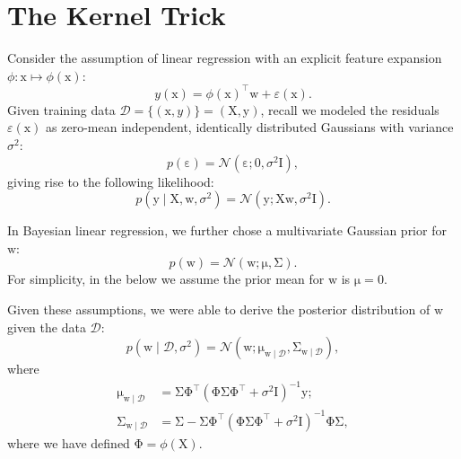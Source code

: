 \documentclass{article}
\newcommand{\given}{\mid}
\newcommand{\mc}[1]{\mathcal{#1}}
\newcommand{\data}{\mc{D}}
\newcommand{\inv}{^{-1}}
\newcommand{\trans}{^\top}
\newcommand{\mat}[1]{\bm{\mathrm{#1}}}
\renewcommand{\vec}[1]{\bm{\mathrm{#1}}}
\renewcommand{\epsilon}{\varepsilon}
\begin{document}
\section*{The Kernel Trick}

Consider the assumption of linear regression with an explicit feature
expansion $\phi\colon \vec{x} \mapsto \phi(\vec{x})$:
\begin{equation}
  \label{linear_assumption}
  y(\vec{x}) = \phi(\vec{x})\trans \vec{w} + \epsilon(\vec{x}).
\end{equation}
Given training data $\data = \bigl\{ (\vec{x}, y) \bigr\} = (\mat{X},
\vec{y})$, recall we modeled the residuals $\epsilon(\vec{x})$ as
zero-mean independent, identically distributed Gaussians with variance
$\sigma^2$:
\begin{equation*}
  p(\vec{\epsilon})
  =
  \mc{N}(\vec{\epsilon}; \vec{0}, \sigma^2 \mat{I}),
\end{equation*}
giving rise to the following likelihood:
\begin{equation*}
  p(\vec{y} \given \mat{X}, \vec{w}, \sigma^2)
  =
  \mc{N}(\vec{y}; \mat{X}\vec{w}, \sigma^2 \mat{I}).
\end{equation*}

In Bayesian linear regression, we further chose a multivariate
Gaussian prior for $\vec{w}$:
\begin{equation*}
  p(\vec{w}) = \mc{N}(\vec{w}; \vec{\mu}, \mat{\Sigma}).
\end{equation*}
For simplicity, in the below we assume the prior mean for $\vec{w}$ is
$\vec{\mu} = \vec{0}$.

Given these assumptions, we were able to derive the posterior
distribution of $\vec{w}$ given the data $\data$:
\begin{equation*}
  p(\vec{w} \given \data, \sigma^2)
  =
  \mc{N}(\vec{w};
  \vec{\mu}_{\vec{w}\given\data},
  \mat{\Sigma}_{\vec{w}\given\data}
  ),
\end{equation*}
where
\begin{align*}
  \vec{\mu}_{\vec{w}\given\data}
  &=
  \mat{\Sigma}
  \mat{\Phi}\trans
  (\mat{\Phi}\mat{\Sigma}\mat{\Phi}\trans + \sigma^2 \mat{I})\inv
  \vec{y};
  \\
  \mat{\Sigma}_{\vec{w}\given\data}
  &=
  \mat{\Sigma}
  -
  \mat{\Sigma}
  \mat{\Phi}\trans
  (\mat{\Phi}\mat{\Sigma}\mat{\Phi}\trans + \sigma^2 \mat{I})\inv
  \mat{\Phi}
  \mat{\Sigma},
\end{align*}
where we have defined $\mat{\Phi} = \phi(\mat{X})$.
\end{document}
